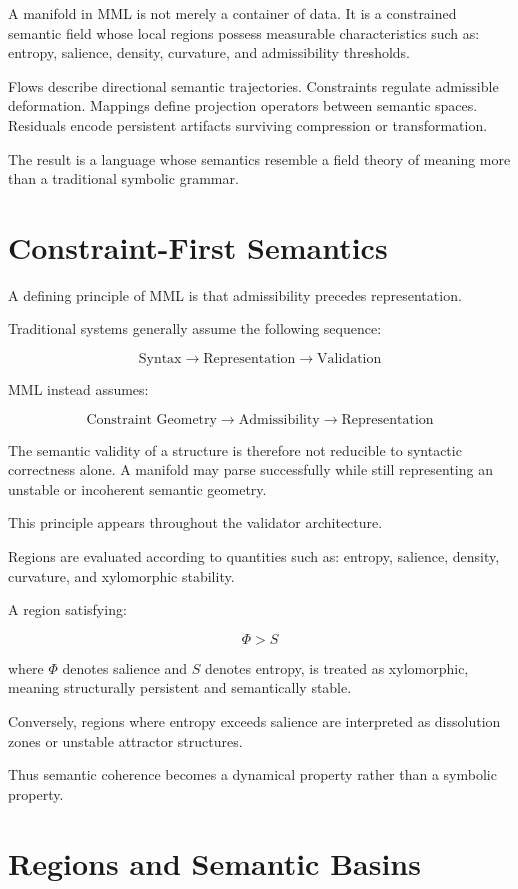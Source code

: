 \documentclass[11pt]{article}
\begin{document}
A manifold in MML is not merely a container of data. It is a constrained semantic field whose local regions possess measurable characteristics such as:
entropy,
salience,
density,
curvature,
and admissibility thresholds.

Flows describe directional semantic trajectories. Constraints regulate admissible deformation. Mappings define projection operators between semantic spaces. Residuals encode persistent artifacts surviving compression or transformation.

The result is a language whose semantics resemble a field theory of meaning more than a traditional symbolic grammar.

\section{Constraint-First Semantics}

A defining principle of MML is that admissibility precedes representation.

Traditional systems generally assume the following sequence:

\[
\text{Syntax} \rightarrow \text{Representation} \rightarrow \text{Validation}
\]

MML instead assumes:

\[
\text{Constraint Geometry} \rightarrow \text{Admissibility} \rightarrow \text{Representation}
\]

The semantic validity of a structure is therefore not reducible to syntactic correctness alone. A manifold may parse successfully while still representing an unstable or incoherent semantic geometry.

This principle appears throughout the validator architecture.

Regions are evaluated according to quantities such as:
entropy,
salience,
density,
curvature,
and xylomorphic stability.

A region satisfying:

\[
\Phi > S
\]

where $\Phi$ denotes salience and $S$ denotes entropy, is treated as xylomorphic, meaning structurally persistent and semantically stable.

Conversely, regions where entropy exceeds salience are interpreted as dissolution zones or unstable attractor structures.

Thus semantic coherence becomes a dynamical property rather than a symbolic property.

\section{Regions and Semantic Basins}
\end{document}
